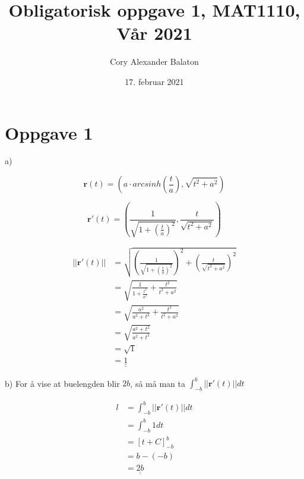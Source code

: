 \documentclass[12pt, a4paper]{article}
\title{Obligatorisk oppgave 1, MAT1110, Vår 2021}
\author{Cory Alexander Balaton}
\date{17. februar 2021}
\begin{document}
\maketitle 
\newpage

\section*{Oppgave 1}

a) 

\begin{equation}
    \textbf{r}(t) = \left(a \cdot arcsinh\left(\frac{t}{a}\right), \sqrt{t^2 + a^2}\right)
\end{equation}

\begin{equation}
    \textbf{r}'(t) = \left(\frac{1}{\sqrt{1 + (\frac{t}{a})^2}}, \frac{t}{\sqrt{t^2 + a^2}}\right)
\end{equation}

\begin{equation}
    \begin{split}
        ||\textbf{r}'(t)|| &= \sqrt{\left(\frac{1}{\sqrt{1 + (\frac{t}{a})^2}}\right)^2 + \left(\frac{t}{\sqrt{t^2 + a^2}}\right)^2} \\
                           &= \sqrt{\frac{1}{1 + \frac{t^2}{a^2}} + \frac{t^2}{t^2 + a^2}} \\
                           &= \sqrt{\frac{a^2}{a^2 + t^2} + \frac{t^2}{t^2 + a^2}} \\
                           &= \sqrt{\frac{a^2 + t^2}{a^2 + t^2}} \\
                           &= \sqrt{1} \\
                           &= \underline{\underline{1}}
    \end{split}
\end{equation}

b) For å vise at buelengden blir $2b$, så må man ta $\int_{-b}^b ||\textbf{r}'(t)|| dt$

\begin{equation}
    \begin{split}
        l &= \int_{-b}^b ||\textbf{r}'(t)|| dt \\
          &= \int_{-b}^b 1 dt \\
          &= [t + C]_{-b}^b \\
          &= b - (-b) \\
          &= \underline{\underline{2b}}
    \end{split}
\end{equation}
\end{document}
